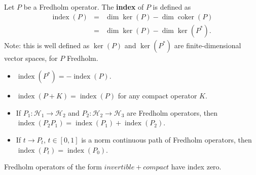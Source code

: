 \documentclass[12pt]{article}
\newcommand*{\hilbert}[1][H]{\mathord{\mathcal{#1}}}
\newcommand*{\coker}{\mathop{\mathrm{coker}}\nolimits}
\newcommand*{\ind}{\mathop{\mathrm{index}}\nolimits}
\theoremstyle{inlinedefn}
\theoremstyle{break}
\begin{document}
Let $P$ be a Fredholm operator.
The \textbf{index} of $P$ is defined as
\begin{eqnarray*}
\ind(P) & = & \dim\ker(P) - \dim\coker(P) \\
& = & \dim\ker(P) - \dim\ker(P^*).
\end{eqnarray*}
Note: this is well defined as $\ker(P)$ and $\ker(P^*)$ are finite-dimensional
vector spaces, for $P$ Fredholm.

\textbf{}

\begin{itemize}
\item $\ind(P^*) = -\ind(P)$.
\item $\ind(P+K) = \ind(P)$ for any compact operator $K$.
\item If $P_1\colon \hilbert_1 \to \hilbert_2$ and $P_2\colon \hilbert_2 \to \hilbert_3$
are Fredholm operators, then $\ind(P_2 P_1) = \ind(P_1) + \ind(P_2)$.
\item If $t \to P_t$, $t \in [0,1]$ is a norm continuous path of Fredholm operators,
then $\ind(P_t) = \ind(P_0)$.
\end{itemize}

Fredholm operators of the form $\mathit{invertible} + \mathit{compact}$ have index zero.

\end{document}
